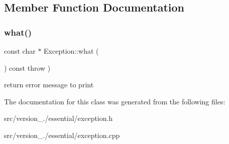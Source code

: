 \subsection{Member Function Documentation}
\mbox{\label{classez_1_1essential_1_1Exception_aa330aa854000f17a93919417d977bcac}} 
\subsubsection{\texorpdfstring{what()}{what()}}
{\footnotesize\ttfamily const char $\ast$ Exception\+::what (\begin{DoxyParamCaption}{ }\end{DoxyParamCaption}) const throw  ) }

return error message to print 

The documentation for this class was generated from the following files\+:\begin{DoxyCompactItemize}
\item 
src/version\+\_./essential/exception.\+h\item 
src/version\+\_./essential/exception.\+cpp\end{DoxyCompactItemize}
